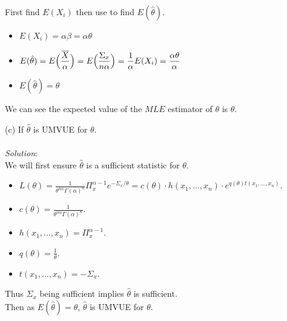 \documentclass[12pt]{article}
\newcommand{\ds}{\displaystyle}
\begin{document}
\noindent
First find $ E(X_{i}) $ then use to find $ E(\hat{\theta}) $. \\

\begin{itemize}
    \item $ \ds E(X_{i}) = \alpha\beta = \alpha\theta $
    \item $ \ds E(\hat{\theta}) = E \Bigl( \frac{\overline{X}}{\alpha} \Bigr) = E \Bigl( \frac{\Sigma_{x}}{n\alpha} \Bigr) = \frac{1}{\alpha}E(X_{i}) = \frac{\alpha\theta }{\alpha} $
    \item $ \ds E(\hat{\theta}) = \theta $
\end{itemize}

\noindent
We can see the expected value of the $ MLE $ estimator of $ \theta $ is $ \theta $. \\

\vspace{2.5mm}

(c) If $ \hat{\theta} $ is UMVUE for $ \theta $. \\
\vspace{2.5mm} \\
\textit{Solution}:
\vspace{2.5mm} \\

\noindent
We will first ensure $ \hat{\theta} $ is a sufficient statistic for $ \theta $. \\

\begin{itemize}
    \item $ \ds L(\theta) = \frac{1}{\theta^{n\alpha}\Gamma(\alpha)^{n}} \Pi_{x}^{\alpha - 1} e^{-\Sigma_{x}/\theta} = c(\theta) \cdot h(x_{1}, \dots, x_{n}) \cdot e^{q(\theta)t(x_{1}, \dots, x_{n})}$.
    \item $ \ds c(\theta) = \frac{1}{\theta^{n\alpha}\Gamma(\alpha)^{n}} $.
    \item $ \ds h(x_{1}, \dots, x_{n}) = \Pi_{x}^{\alpha - 1} $.
    \item $ \ds q(\theta) = \frac{1}{\theta} $.
    \item $ \ds t(x_{1}, \dots, x_{n}) = -\Sigma_{x} $.
\end{itemize}

\noindent
Thus $ \Sigma_{x} $ being sufficient implies $ \hat{\theta} $ is sufficient. \\

\noindent
Then as $ \ds E(\hat{\theta}) = \theta $, $ \hat{\theta} $ is UMVUE for $ \theta $. \\
\end{document}
